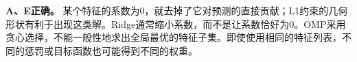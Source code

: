 \textbf{A、E正确。} 某个特征的系数为0，就去掉了它对预测的直接贡献；L1约束的几何形状有利于出现这类解。Ridge通常缩小系数，而不是让系数恰好为0。OMP采用贪心选择，不能一般性地求出全局最优的特征子集。即使使用相同的特征列表，不同的惩罚或目标函数也可能得到不同的权重。
